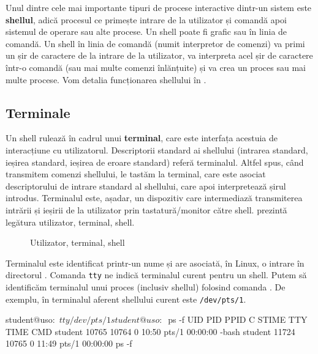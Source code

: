 Unul dintre cele mai importante tipuri de procese interactive dintr-un sistem
este \textbf{shellul}, adică procesul ce primește intrare de la utilizator și comandă
apoi sistemul de operare sau alte procese. Un shell poate fi grafic sau în linia de comandă. Un
shell în linia de comandă (numit interpretor de comenzi) va primi un șir de caractere de la
intrare de la utilizator, va interpreta acel șir de caractere într-o comandă (sau mai multe
comenzi înlănțuite) și va crea un proces sau mai multe procese. Vom detalia
funcționarea shellului în .

\subsection{Terminale}
\label{sec:process:terminal}

Un shell rulează în cadrul unui \textbf{terminal}, care este interfața acestuia de
interacțiune cu utilizatorul. Descriptorii standard ai shellului (intrarea
standard, ieșirea standard, ieșirea de eroare standard) referă terminalul.
Altfel spus, când transmitem comenzi shellului, le tastăm la terminal, care
este asociat descriptorului de intrare standard al shellului, care apoi
interpretează șirul introdus. Terminalul este, așadar, un dispozitiv care
intermediază transmiterea intrării și ieșirii de la utilizator prin tastatură/monitor către
shell.  prezintă legătura utilizator, terminal, shell.

\begin{figure}[!htbp]
	\centering
	\def\svgwidth{0.4\textwidth}
	
	\caption{Utilizator, terminal, shell}
	\label{fig:process:terminal-shell}
\end{figure}

Terminalul este identificat printr-un nume și are asociată, în Linux, o intrare
în directorul . Comanda \texttt{tty} ne indică terminalul curent pentru un shell.
Putem să identificăm terminalul unui proces (inclusiv shellul) folosind comanda
. De exemplu, în  terminalul aferent shellului curent este \texttt{/dev/pts/1}.

\begin{screen}[caption={Identificarea terminalului unui proces},label={lst:process:get-terminal}]
student@uso:~$ tty
/dev/pts/1
student@uso:~$ ps -f
UID        PID  PPID  C STIME TTY          TIME CMD
student  10765 10764  0 10:50 pts/1    00:00:00 -bash
student  11724 10765  0 11:49 pts/1    00:00:00 ps -f
\end{screen}

